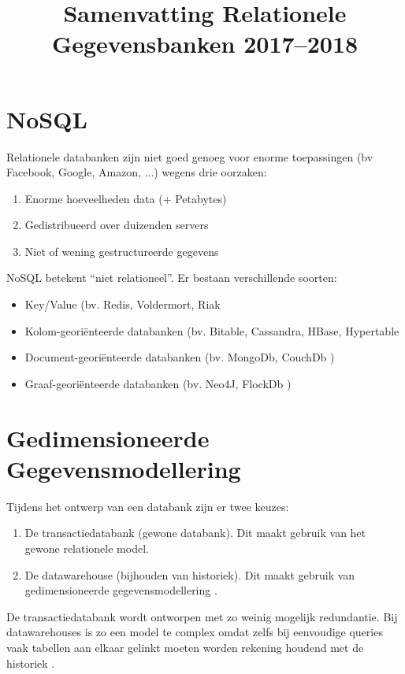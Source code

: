 \documentclass{article}
\begin{document}
\def\warning#1{\color{red}#1 \color{black}}
\def\note#1{\color{cyan}#1 \color{black}}

\title{Samenvatting Relationele Gegevensbanken 2017--2018}
\author{}
\date{}
\maketitle
\tableofcontents
\section{NoSQL}
Relationele databanken zijn niet goed genoeg voor enorme toepassingen (bv Facebook, Google, Amazon, ...) wegens drie oorzaken:
\begin{enumerate}
	\item {Enorme hoeveelheden data (+ Petabytes)}
	\item {Gedistribueerd over duizenden servers}
	\item {Niet of wening gestructureerde gegevens}
\end{enumerate}
NoSQL betekent ``niet relationeel''. Er bestaan verschillende soorten:
\begin{itemize}
	\item {Key/Value (bv. \note{Redis, Voldermort, Riak}}
	\item {Kolom-georiënteerde databanken (bv. \note{Bitable, Cassandra, HBase, Hypertable}}
	\item {Document-georiënteerde databanken (bv. \note{MongoDb, CouchDb})}
	\item {Graaf-georiënteerde databanken (bv. \note{Neo4J, FlockDb})}
\end{itemize}

\section{Gedimensioneerde Gegevensmodellering}
Tijdens het ontwerp van een databank zijn er twee keuzes:
\begin{enumerate}
	\item {De transactiedatabank (gewone databank). Dit maakt gebruik van het gewone relationele model.}
	\item {De datawarehouse (bijhouden van historiek). Dit maakt gebruik van \note{gedimensioneerde gegevensmodellering}.}
\end{enumerate}
De transactiedatabank wordt ontworpen met zo weinig mogelijk redundantie. Bij datawarehouses is zo een model te complex omdat zelfs bij eenvoudige queries vaak tabellen aan elkaar gelinkt moeten worden rekening houdend met de \note{historiek}.
\end{document}
